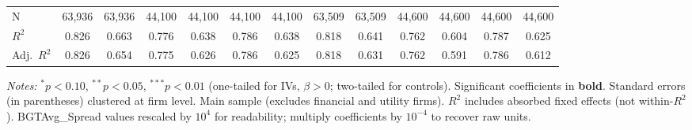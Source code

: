 \documentclass[11pt,a4paper]{article}
\begin{document}
\begin{table}[htbp]
\begin{tabular}{lcccccccccccc}
\midrule
N & 63,936 & 63,936 & 44,100 & 44,100 & 44,100 & 44,100 & 63,509 & 63,509 & 44,600 & 44,600 & 44,600 & 44,600 \\
$R^2$ & 0.826 & 0.663 & 0.776 & 0.638 & 0.786 & 0.638 & 0.818 & 0.641 & 0.762 & 0.604 & 0.787 & 0.625 \\
Adj.~$R^2$ & 0.826 & 0.654 & 0.775 & 0.626 & 0.786 & 0.625 & 0.818 & 0.631 & 0.762 & 0.591 & 0.786 & 0.612 \\
\bottomrule
\end{tabular}
\begin{minipage}{\linewidth}
\vspace{2pt}\scriptsize
\textit{Notes:} $^{*}p<0.10$, $^{**}p<0.05$, $^{***}p<0.01$ (one-tailed for IVs, $\beta > 0$; two-tailed for controls).
 Significant coefficients in \textbf{bold}.
 Standard errors (in parentheses) clustered at firm level.
 Main sample (excludes financial and utility firms).
 $R^2$ includes absorbed fixed effects (not within-$R^2$).
 BGTAvg\_Spread values rescaled by $10^4$ for readability; multiply coefficients by $10^{-4}$ to recover raw units.
\end{minipage}
\end{table}
\clearpage
\end{document}
